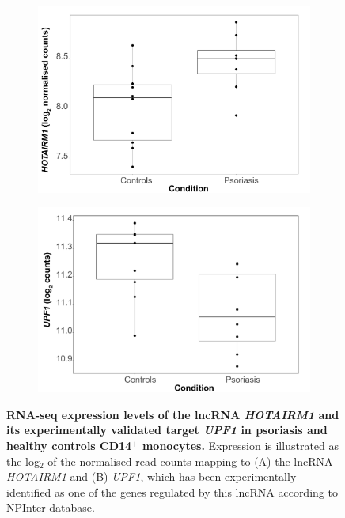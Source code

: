  \begin{figure}[htbp]
\centering
\begin{subfigure}{0.45\textwidth}
\centering
\includegraphics[width=\textwidth]{./Results2/pdfs/RNAseq_PS_CTL_lncRNA_HOTAIRM1_CD14}
\caption{\textbf{}}
\end{subfigure}%
\begin{subfigure}{0.45\textwidth}
\centering
\includegraphics[width=\textwidth]{./Results2/pdfs/RNAseq_PS_CTL_lncRNA_UPF1_CD14}
\caption{\textbf{}}
\end{subfigure}
\caption[RNA-seq expression levels of the lncRNA \textit{HOTAIRM1} and its experimentally validated target \textit{UPF1} in psoriasis and healthy controls CD14$^+$ monocytes.]{\textbf{RNA-seq expression levels of the lncRNA \textit{HOTAIRM1} and its experimentally validated target \textit{UPF1} in psoriasis and healthy controls CD14$^+$ monocytes.} Expression is illustrated as the log$_2$ of the normalised read counts mapping to (A) the lncRNA \textit{HOTAIRM1} and (B) \textit{UPF1}, which has been experimentally identified as one of the genes regulated by this lncRNA according to NPInter database.}
\label{figure:RNAseq_PS_CTL_CD14_expression_HOTAIRM_UPF1}
\end{figure} 


